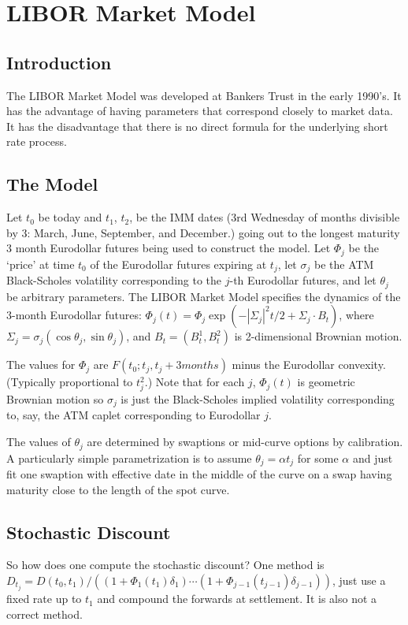 
\chapter{LIBOR Market Model}

\section{Introduction}
The LIBOR Market Model was developed at Bankers Trust in the early
1990's. It has the advantage of having parameters that correspond closely
to market data. It has the disadvantage that there is no direct formula
for the underlying short rate process.

\section{The Model}
Let $t_0$ be today and $t_1$, $t_2$, be the IMM dates (3rd Wednesday
of months divisible by 3: March, June, September, and December.)
going out to the longest maturity 3 month
Eurodollar futures being used to construct the model. Let $\Phi_j$ be the
`price' at time $t_0$ of the Eurodollar futures expiring at $t_j$,
let $\sigma_j$ be the ATM Black-Scholes volatility corresponding
to the $j$-th Eurodollar futures, and let $\theta_j$ be arbitrary
parameters. The LIBOR Market Model specifies the dynamics of the 3-month
Eurodollar futures: $\Phi_j(t) = \Phi_j \exp(-|\Sigma_j|^2t/2 + \Sigma_j
\cdot B_t)$, where $\Sigma_j = \sigma_j(\cos\theta_j, \sin\theta_j)$,
and $B_t = (B_t^1, B_t^2)$ is 2-dimensional Brownian motion.

The values for $\Phi_j$ are $F(t_0; t_j, t_j + 3months)$ minus the
Eurodollar convexity. (Typically proportional to $t_j^2$.) Note that
for each $j$, $\Phi_j(t)$ is geometric Brownian motion so $\sigma_j$
is just the Black-Scholes implied volatility corresponding to, say,
the ATM caplet corresponding to Eurodollar $j$.

The values of $\theta_j$ are determined by swaptions or mid-curve options
by calibration. A particularly simple parametrization is to assume
$\theta_j = \alpha t_j$ for some $\alpha$ and just fit one swaption
with effective date in the middle of the curve on a swap having
maturity close to the length of the spot curve.

\section{Stochastic Discount}
So how does one compute the stochastic discount?  One method
is $D_{t_j} = D(t_0, t_1)/((1 + \Phi_1(t_1)\delta_1)\cdots (1 +
\Phi_{j-1}(t_{j-1})\delta_{j-1}))$, just use a fixed rate up to $t_1$
and compound the forwards at settlement. It is also not a correct
method.

